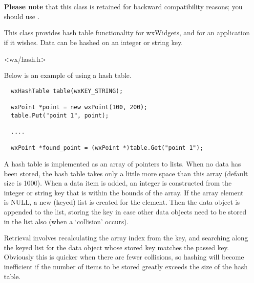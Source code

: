 \section{}\label{wxhashtable}

{\bf Please note} that this class is retained for backward compatibility
reasons; you should use .

This class provides hash table functionality for wxWidgets, and for an
application if it wishes.  Data can be hashed on an integer or string
key.




<wx/hash.h>


Below is an example of using a hash table.

\begin{verbatim}
  wxHashTable table(wxKEY_STRING);

  wxPoint *point = new wxPoint(100, 200);
  table.Put("point 1", point);

  ....

  wxPoint *found_point = (wxPoint *)table.Get("point 1");
\end{verbatim}

A hash table is implemented as an array of pointers to lists. When no
data has been stored, the hash table takes only a little more space than
this array (default size is 1000).  When a data item is added, an
integer is constructed from the integer or string key that is within the
bounds of the array. If the array element is NULL, a new (keyed) list is
created for the element. Then the data object is appended to the list,
storing the key in case other data objects need to be stored in the list
also (when a `collision' occurs).

Retrieval involves recalculating the array index from the key, and searching
along the keyed list for the data object whose stored key matches the passed
key. Obviously this is quicker when there are fewer collisions, so hashing
will become inefficient if the number of items to be stored greatly exceeds
the size of the hash table.




